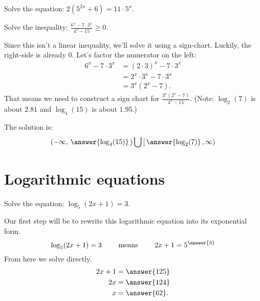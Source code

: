 \documentclass{ximera}
\begin{document}
\begin{problem}
	Solve the equation: $\displaystyle 2\left(5^{2x} + 6\right) = 11 \cdot 5^x$.
	\begin{selectAll}
	\end{selectAll}
\end{problem}

\begin{example}
	Solve the inequality: $\displaystyle \frac{6^x - 7 \cdot 3^x}{4^x - 15} \ge 0$.
	\begin{explanation}
		Since this isn't a linear inequality, we'll solve it using a sign-chart.  Luckily, the right-side is already $0$.  Let's factor the numerator on the left:
		\begin{align*} 
			6^x - 7 \cdot 3^x &= \left(2\cdot 3\right)^x - 7 \cdot 3^x \\
				&= 2^x \cdot 3^x - 7 \cdot 3^x\\
				&= 3^x \left( 2^x - 7 \right).
		\end{align*}
		That means we need to construct a sign chart for $\displaystyle \frac{3^x \left( 2^x - 7\right)}{4^x - 15}$.
		(Note: $\log_{2}(7)$ is about $2.81$ and $\log_{4}(15)$ is about $1.95$.)
		
		\begin{center}
		\end{center}
		The solution is:
		\[ \left( -\infty, \, \answer{\log_{4}(15)} \, \right) \bigcup \left[ \,\answer{\log_{2}(7)} \,, \infty \right) \]
	\end{explanation}
\end{example}
\section{Logarithmic equations}

\begin{example}
	Solve the equation: $\displaystyle \log_5( 2x+1) = 3$.
	\begin{explanation}
		Our first step will be to rewrite this logarithmic equation into its exponential form.
		\[ \log_5(2x+1) = 3 \qquad \textrm{ means } \qquad 2x+1 = 5^{\answer{3}} \]
		From here we solve directly.
		\begin{align*}
			2x+1 &= \answer{125}\\
			2x &= \answer{124}\\
			x &= \answer{62}.
		\end{align*}
	\end{explanation}
\end{example}
\end{document}
